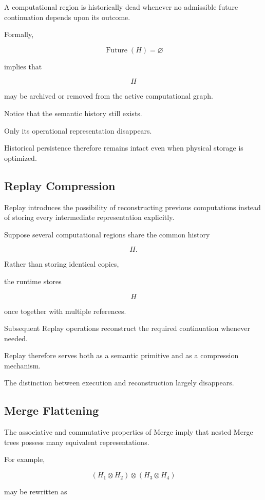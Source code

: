 \documentclass[12pt,oneside]{article}
\theoremstyle{definition}
\theoremstyle{remark}
\begin{document}
A computational region is historically dead whenever no admissible future
continuation depends upon its outcome.

Formally,

\[
\operatorname{Future}(H)
=
\varnothing
\]

implies that

\[
H
\]

may be archived or removed from the active computational graph.

Notice that the semantic history still exists.

Only its operational representation disappears.

Historical persistence therefore remains intact even when physical storage is
optimized.

\subsection{Replay Compression}

Replay introduces the possibility of reconstructing previous computations
instead of storing every intermediate representation explicitly.

Suppose several computational regions share the common history

\[
H.
\]

Rather than storing identical copies,

the runtime stores

\[
H
\]

once together with multiple references.

Subsequent Replay operations reconstruct the required continuation whenever
needed.

Replay therefore serves both as a semantic primitive and as a compression
mechanism.

The distinction between execution and reconstruction largely disappears.

\subsection{Merge Flattening}

The associative and commutative properties of Merge imply that nested Merge
trees possess many equivalent representations.

For example,

\[
(H_1\otimes H_2)\otimes(H_3\otimes H_4)
\]

may be rewritten as
\end{document}
